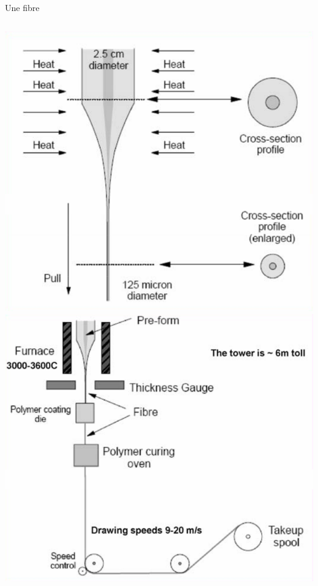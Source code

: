 \documentclass[aspectratio=149, 10pt, t]{beamer}
\begin{document}
\begin{frame}{Une fibre}
    \begin{columns}
        \begin{column}{0.5\linewidth}
            \begin{minipage}[b]{\linewidth}
                \centering
                \includegraphics[height=0.33\textheight]{images/fabrication_1}
                \includegraphics[height=0.33\textheight]{images/fabrication_2}


\end{minipage}
\end{column}
\end{columns}
\end{frame}
\end{document}

